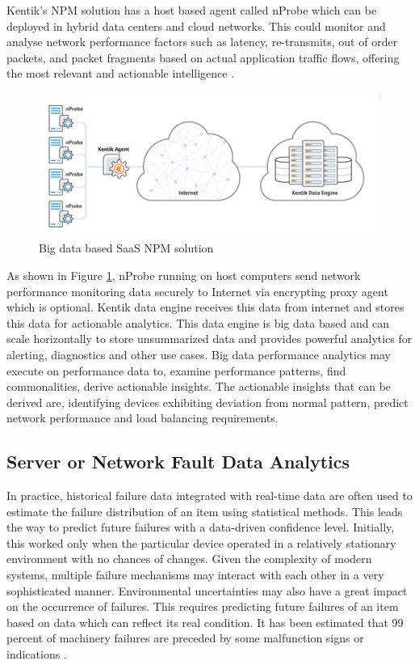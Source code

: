 \documentclass[sigconf]{acmart}
\begin{document}
Kentik's NPM solution has a host based agent called nProbe which can be deployed in hybrid data centers and cloud networks. This could monitor and analyse network performance factors such as latency, re-transmits, out of order packets, and packet fragments based on actual application traffic flows, offering the most relevant and actionable intelligence \cite{kentik-introduces-new-npm-solution}.

\begin{figure}[htb]
  \centering
  \includegraphics[width=1.0\textwidth]{images/Figure3.png}
  \caption{Big data based SaaS NPM solution 
  \cite{big-data-network-performance-monitoring}}
  \label{fig:Figure3} 
\end{figure}

As shown in Figure \ref{fig:Figure3}, nProbe running on host computers send network performance monitoring data securely to Internet via encrypting proxy agent which is optional. Kentik data engine receives this data from internet and stores this data for actionable analytics. This data engine is big data based and can scale horizontally to store unsummarized data and provides powerful analytics for alerting, diagnostics and other use cases. Big data performance analytics may execute on performance data to, examine performance patterns, find commonalities, derive actionable insights. The actionable insights that can be derived are, identifying devices exhibiting deviation from normal pattern, predict network performance and load balancing requirements.


\subsection{Server or Network Fault Data Analytics}

In practice, historical failure data integrated with real-time data are often used to estimate the failure distribution of an item using statistical methods. This leads the way to predict future failures with a data-driven confidence level. Initially, this worked only when the particular device operated in a relatively stationary environment with no chances of changes. Given the complexity of modern systems, multiple failure mechanisms may interact with each other in a very sophisticated manner. Environmental uncertainties may also have a great impact on the occurrence of failures. This requires predicting future failures of an item based on data which can reflect its real condition. It has been estimated that 99 percent of machinery failures are preceded by some malfunction signs or indications \cite{big-data-analytics-for-fault-detection}. 
\end{document}
